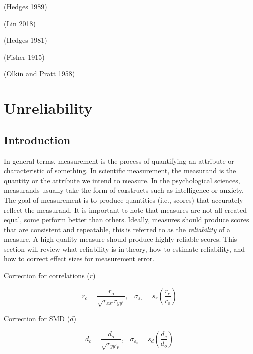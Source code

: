 \documentclass[
  letterpaper,
  DIV=11,
  numbers=noendperiod]{scrreprt}
\begin{document}
(Hedges 1989)

(Lin 2018)

(Hedges 1981)

(Fisher 1915)

(Olkin and Pratt 1958)

\hypertarget{unreliability}{%
\chapter{Unreliability}\label{unreliability}}

\hypertarget{introduction}{%
\section{Introduction}\label{introduction}}

In general terms, measurement is the process of quantifying an attribute
or characteristic of something. In scientific measurement, the measurand
is the quantity or the attribute we intend to measure. In the
psychological sciences, measurands usually take the form of constructs
such as intelligence or anxiety. The goal of measurement is to produce
quantities (i.e., scores) that accurately reflect the measurand. It is
important to note that measures are not all created equal, some perform
better than others. Ideally, measures should produce scores that are
consistent and repeatable, this is referred to as the \emph{reliability}
of a measure. A high quality measure should produce highly reliable
scores. This section will review what reliability is in theory, how to
estimate reliability, and how to correct effect sizes for measurement
error.

\begin{tcolorbox}[enhanced jigsaw, toptitle=1mm, titlerule=0mm, coltitle=black, colbacktitle=quarto-callout-note-color!10!white, opacityback=0, bottomrule=.15mm, colback=white, leftrule=.75mm, breakable, rightrule=.15mm, bottomtitle=1mm, opacitybacktitle=0.6, title={\faIcon{bolt} Too long didn't read?}, arc=.35mm, colframe=quarto-callout-note-color-frame, toprule=.15mm, left=2mm]

Correction for correlations (\(r\))

\[r_c = \frac{r_o}{\sqrt{r_{xx'}r_{yy'}}},\;\;\; \sigma_{\varepsilon_c} = s_r \left(\frac{r_c}{r_o}\right)\]

Correction for SMD (\(d\))

\[d_c = \frac{d_o}{\sqrt{r_{yy'_P}}},\;\;\; \sigma_{\varepsilon_c} = s_d \left(\frac{d_c}{d_o}\right)\]

\end{tcolorbox}
\end{document}
